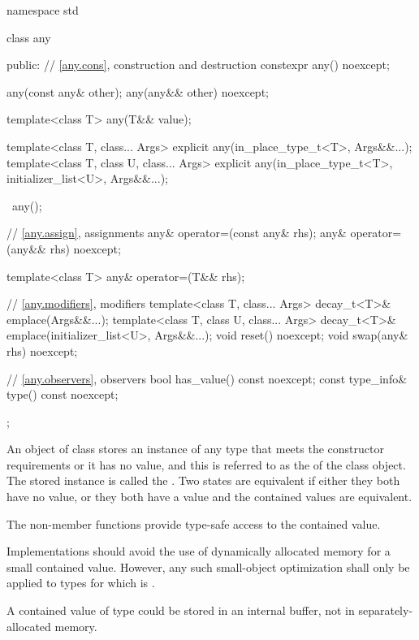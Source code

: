 \begin{codeblock}
namespace std {
  class any {
  public:
    // \ref{any.cons}, construction and destruction
    constexpr any() noexcept;

    any(const any& other);
    any(any&& other) noexcept;

    template<class T>
      any(T&& value);

    template<class T, class... Args>
      explicit any(in_place_type_t<T>, Args&&...);
    template<class T, class U, class... Args>
      explicit any(in_place_type_t<T>, initializer_list<U>, Args&&...);

    ~any();

    // \ref{any.assign}, assignments
    any& operator=(const any& rhs);
    any& operator=(any&& rhs) noexcept;

    template<class T>
      any& operator=(T&& rhs);

    // \ref{any.modifiers}, modifiers
    template<class T, class... Args>
      decay_t<T>& emplace(Args&&...);
    template<class T, class U, class... Args>
      decay_t<T>& emplace(initializer_list<U>, Args&&...);
    void reset() noexcept;
    void swap(any& rhs) noexcept;

    // \ref{any.observers}, observers
    bool has_value() const noexcept;
    const type_info& type() const noexcept;
  };
}
\end{codeblock}

\pnum
An object of class  stores an instance of any type that meets the constructor requirements or it has no value,
and this is referred to as the  of the class  object.
The stored instance is called the .
Two states are equivalent if either they both have no value, or they both have a value and the contained values are equivalent.

\pnum
The non-member  functions provide type-safe access to the contained value.

\pnum
Implementations should avoid the use of dynamically allocated memory for a small contained value.
However, any such small-object optimization shall only be applied to types  for which
 is .
\begin{example}
A contained value of type  could be stored in an internal buffer,
not in separately-allocated memory.
\end{example}

